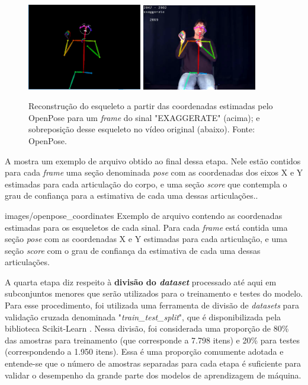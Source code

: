 \begin{figure}[ht]
    \centering
    \includegraphics[width=5cm]{images/sign_pose}
    \includegraphics[width=5cm]{images/sign_pose_blended}
    \caption{Reconstrução do esqueleto a partir das coordenadas estimadas pelo OpenPose para um \textit{frame} do sinal "EXAGGERATE" (acima); e sobreposição desse esqueleto no vídeo original (abaixo). Fonte: OpenPose.}
    \label{fig:sign-pose}
\end{figure}

A  mostra um exemplo de arquivo obtido ao final dessa etapa. Nele estão contidos para cada \textit{frame} uma seção denominada \textit{pose} com as coordenadas dos eixos X e Y estimadas para cada articulação do corpo, e uma seção \textit{score} que contempla o grau de confiança para a estimativa de cada uma dessas articulações..

    {images/openpose_coordinates}
    {Exemplo de arquivo contendo as coordenadas estimadas para os esqueletos de cada sinal. Para cada \textit{frame} está contida uma seção \textit{pose} com as coordenadas X e Y estimadas para cada articulação, e uma seção \textit{score} com o grau de confiança da estimativa de cada uma dessas articulações.}

A quarta etapa diz respeito à \textbf{divisão do \textit{dataset}} processado até aqui em subconjuntos menores que serão utilizados para o treinamento e testes do modelo. Para esse procedimento, foi utilizada uma ferramenta de divisão de \textit{datasets} para validação cruzada denominada "\textit{train\_test\_split}", que é disponibilizada pela biblioteca Scikit-Learn \cite{scikit-learn}. Nessa divisão, foi considerada uma proporção de 80\% das amostras para treinamento (que corresponde a 7.798 itens) e 20\% para testes (correspondendo a 1.950 itens). Essa é uma proporção comumente adotada e entende-se que o número de amostras separadas para cada etapa é suficiente para validar o desempenho da grande parte dos modelos de aprendizagem de máquina.

